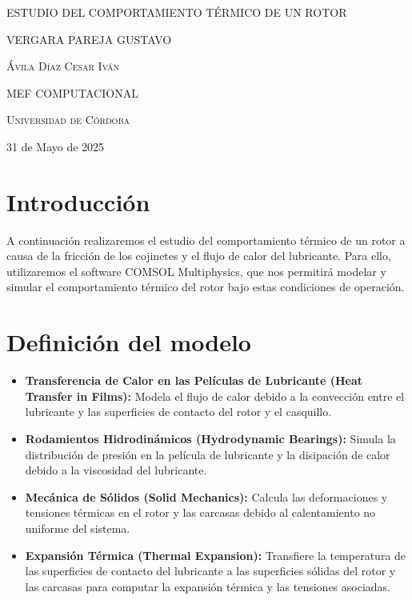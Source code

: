 \documentclass{article}
\author{Gustavo Vergara}
\theoremstyle{mytheoremstyle}
\theoremstyle{mytheoremstyle}
\theoremstyle{myproblemstyle}
\begin{document}

\begin{titlepage}
    \centering
    \vspace{2.5cm}
    {\scshape \Large ESTUDIO DEL COMPORTAMIENTO TÉRMICO DE UN ROTOR\par} %
    \vspace{5cm}
    \vspace{0.5cm}
    {\Large VERGARA PAREJA GUSTAVO\par}
    \vspace{5cm}
    {\scshape\Large Ávila Díaz Cesar Iván\par}
    \vspace{0.3cm}
    {\scshape\Large MEF COMPUTACIONAL \par}
    \vspace{0.3cm}
    {\scshape\Large Universidad de Córdoba\par}
    \vspace{0.3cm}
    {\Large 31 de Mayo de 2025 \par}
\end{titlepage}
\tableofcontents
\newpage
\section{Introducción}

    A continuación realizaremos el estudio del comportamiento térmico de un rotor a causa de la fricción de los cojinetes y el flujo de calor del lubricante. Para ello, utilizaremos el software COMSOL Multiphysics, que nos permitirá modelar y simular el comportamiento térmico del rotor bajo estas condiciones de operación.
\section{Definición del modelo}
  \begin{itemize}
    \item \textbf{Transferencia de Calor en las Películas de Lubricante (Heat Transfer in Films):} Modela el flujo de calor debido a la convección entre el lubricante y las superficies de contacto del rotor y el casquillo.
    \item \textbf{Rodamientos Hidrodinámicos (Hydrodynamic Bearings):} Simula la distribución de presión en la película de lubricante y la disipación de calor debido a la viscosidad del lubricante.
    \item \textbf{Mecánica de Sólidos (Solid Mechanics):} Calcula las deformaciones y tensiones térmicas en el rotor y las carcasas debido al calentamiento no uniforme del sistema.
    \item \textbf{Expansión Térmica (Thermal Expansion):} Transfiere la temperatura de las superficies de contacto del lubricante a las superficies sólidas del rotor y las carcasas para computar la expansión térmica y las tensiones asociadas.
  \end{itemize}
\end{document}
